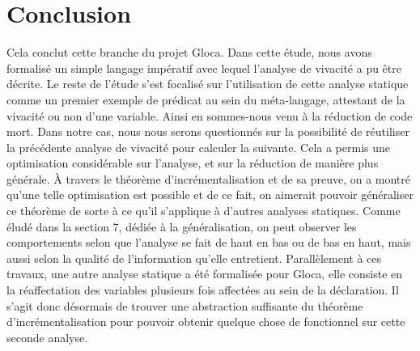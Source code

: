 \documentclass[a4paper, 10pt]{article}
\begin{document}
\section{Conclusion}
Cela conclut cette branche du projet Gloca. Dans cette étude, nous avons formalisé un simple langage impératif avec lequel
l'analyse de vivacité a pu être décrite. Le reste de l'étude s'est focalisé sur l'utilisation de cette analyse statique comme
un premier exemple de prédicat au sein du méta-langage, attestant de la vivacité ou non d'une variable. Ainsi en sommes-nous venu
à la réduction de code mort. Dans notre cas, nous nous serons questionnés sur la possibilité de réutiliser la précédente analyse
de vivacité pour calculer la suivante. Cela a permis une optimisation considérable sur l'analyse, et sur la réduction de manière
plus générale. À travers le théorème d'incrémentalisation et de sa preuve, on a montré qu'une telle optimisation est possible et
de ce fait, on aimerait pouvoir généraliser ce théorème de sorte à ce qu'il s'applique à
d'autres analyses statiques. Comme éludé dans la section 7, dédiée à la généralisation, on peut observer les comportements selon
que l'analyse se fait de haut en bas ou de bas en haut, mais aussi selon la qualité de l'information qu'elle entretient. Parallèlement à
ces travaux, une autre analyse statique a été formalisée pour Gloca, elle consiste en la réaffectation des variables plusieurs fois
affectées au sein de la déclaration. Il s'agit donc désormais de trouver une abstraction suffisante du théorème d'incrémentalisation 
pour pouvoir obtenir quelque chose de fonctionnel sur cette seconde analyse.
\end{document}

